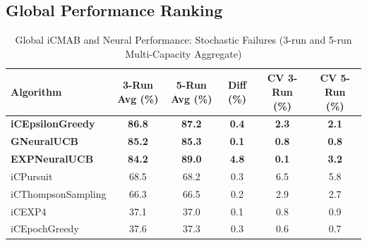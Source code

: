 \documentclass[12pt,a4paper]{article}
\newcommand{\primarytext}[1]{\textcolor{primaryblue}{\textbf{#1}}}
\newcommand{\legacy}[1]{\textcolor{legacycolor}{\textbf{#1}}}
\newcommand{\neural}[1]{\textcolor{neuralcolor}{\textbf{#1}}}
\begin{document}
\begin{tcolorbox}[colback=tableheader,colframe=primaryblue,title=\textbf{Primary iCMAB Performance Results (Stochastic Environment, Attack Rate: 0.25)}]

\subsection{Global Performance Ranking}

\begin{table}[H]
\centering
\caption{Global iCMAB and Neural Performance: Stochastic Failures (3-run and 5-run Multi-Capacity Aggregate)}
\label{tab:global-performance-stochastic}
\begin{tabular}{@{}lccccc@{}}
\toprule
\textbf{Algorithm} & \textbf{3-Run Avg (\%)} & \textbf{5-Run Avg (\%)} & \textbf{Diff (\%)} & \textbf{CV 3-Run (\%)} & \textbf{CV 5-Run (\%)} \\
\midrule
\primarytext{iCEpsilonGreedy}   & \primarytext{86.8} & \primarytext{87.2} & \primarytext{0.4} & \primarytext{2.3} & \primarytext{2.1} \\
\neural{GNeuralUCB}            & \neural{85.2} & \neural{85.3} & \neural{0.1} & \neural{0.8} & \neural{0.8} \\
\legacy{EXPNeuralUCB}           & \legacy{84.2} & \legacy{89.0} & \legacy{4.8} & \legacy{0.1} & \legacy{3.2} \\
iCPursuit                       & 68.5 & 68.2 & 0.3 & 6.5 & 5.8 \\
iCThompsonSampling              & 66.3 & 66.5 & 0.2 & 2.9 & 2.7 \\
iCEXP4                          & 37.1 & 37.0 & 0.1 & 0.8 & 0.9 \\
iCEpochGreedy                   & 37.6 & 37.3 & 0.3 & 0.6 & 0.7 \\
\bottomrule
\end{tabular}
\end{table}


\end{tcolorbox}
\end{document}
